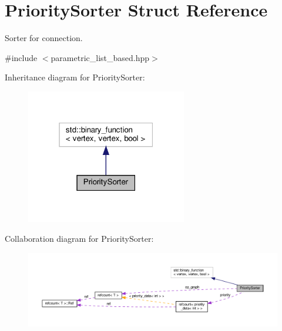 \hypertarget{structPrioritySorter}{}\section{Priority\+Sorter Struct Reference}
\label{structPrioritySorter}


Sorter for connection.  




{\ttfamily \#include $<$parametric\+\_\+list\+\_\+based.\+hpp$>$}



Inheritance diagram for Priority\+Sorter\+:
\nopagebreak
\begin{figure}[H]
\begin{center}
\leavevmode
\includegraphics[width=199pt]{dd/df4/structPrioritySorter__inherit__graph}
\end{center}
\end{figure}


Collaboration diagram for Priority\+Sorter\+:
\nopagebreak
\begin{figure}[H]
\begin{center}
\leavevmode
\includegraphics[width=350pt]{d0/d2f/structPrioritySorter__coll__graph}
\end{center}
\end{figure}
